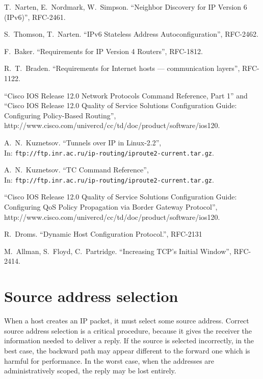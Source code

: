\begin{thebibliography}{99}
 T.~Narten, E.~Nordmark, W.~Simpson.
``Neighbor Discovery for IP Version 6 (IPv6)'', RFC-2461.

 S.~Thomson, T.~Narten.
``IPv6 Stateless Address Autoconfiguration'', RFC-2462.

 F.~Baker.
``Requirements for IP Version 4 Routers'', RFC-1812.

 R.~T.~Braden.
``Requirements for Internet hosts --- communication layers'', RFC-1122.

 ``Cisco IOS Release 12.0 Network Protocols
Command Reference, Part 1'' and
``Cisco IOS Release 12.0 Quality of Service Solutions
Configuration Guide: Configuring Policy-Based Routing'',\\
http://www.cisco.com/univercd/cc/td/doc/product/software/ios120.

 A.~N.~Kuznetsov.
``Tunnels over IP in Linux-2.2'', \\
In: {\tt ftp://ftp.inr.ac.ru/ip-routing/iproute2-current.tar.gz}.

 A.~N.~Kuznetsov. ``TC Command Reference'',\\
In: {\tt ftp://ftp.inr.ac.ru/ip-routing/iproute2-current.tar.gz}.

 ``Cisco IOS Release 12.0 Quality of Service Solutions
Configuration Guide: Configuring QoS Policy Propagation via
Border Gateway Protocol'',\\
http://www.cisco.com/univercd/cc/td/doc/product/software/ios120.

 R.~Droms.
``Dynamic Host Configuration Protocol.'', RFC-2131

  M.~Allman, S.~Floyd, C.~Partridge.
``Increasing TCP's Initial Window'', RFC-2414.

\end{thebibliography}




\appendix
{}

\section{Source address selection}
\label{ADDR-SEL}

When a host creates an IP packet, it must select some source
address. Correct source address selection is a critical procedure,
because it gives the receiver the information needed to deliver a
reply. If the source is selected incorrectly, in the best case,
the backward path may appear different to the forward one which
is harmful for performance. In the worst case, when the addresses
are administratively scoped, the reply may be lost entirely.

